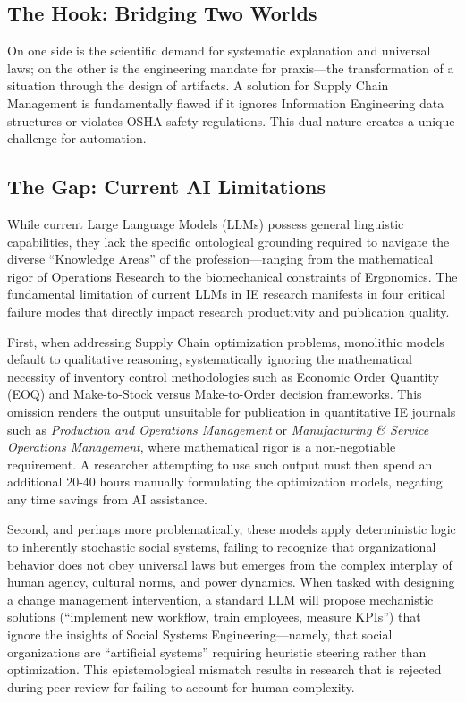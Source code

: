 \documentclass[12pt,a4paper]{article}
\begin{document}
\subsection{The Hook: Bridging Two Worlds}

On one side is the scientific demand for systematic explanation and universal laws; on the other is the engineering mandate for praxis—the transformation of a situation through the design of artifacts. A solution for Supply Chain Management is fundamentally flawed if it ignores Information Engineering data structures or violates OSHA safety regulations. This dual nature creates a unique challenge for automation.

\subsection{The Gap: Current AI Limitations}

While current Large Language Models (LLMs) possess general linguistic capabilities, they lack the specific ontological grounding required to navigate the diverse ``Knowledge Areas'' of the profession—ranging from the mathematical rigor of Operations Research to the biomechanical constraints of Ergonomics. The fundamental limitation of current LLMs in IE research manifests in four critical failure modes that directly impact research productivity and publication quality.

First, when addressing Supply Chain optimization problems, monolithic models default to qualitative reasoning, systematically ignoring the mathematical necessity of inventory control methodologies such as Economic Order Quantity (EOQ) and Make-to-Stock versus Make-to-Order decision frameworks. This omission renders the output unsuitable for publication in quantitative IE journals such as \textit{Production and Operations Management} or \textit{Manufacturing \& Service Operations Management}, where mathematical rigor is a non-negotiable requirement. A researcher attempting to use such output must then spend an additional 20-40 hours manually formulating the optimization models, negating any time savings from AI assistance.

Second, and perhaps more problematically, these models apply deterministic logic to inherently stochastic social systems, failing to recognize that organizational behavior does not obey universal laws but emerges from the complex interplay of human agency, cultural norms, and power dynamics. When tasked with designing a change management intervention, a standard LLM will propose mechanistic solutions (``implement new workflow, train employees, measure KPIs'') that ignore the insights of Social Systems Engineering—namely, that social organizations are ``artificial systems'' requiring heuristic steering rather than optimization. This epistemological mismatch results in research that is rejected during peer review for failing to account for human complexity.
\end{document}
